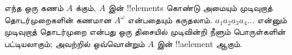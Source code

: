 \documentclass[../../../include/open-logic-section]{subfiles}
\begin{document}
\begin{ex}[முடிவுறாத் தொடர்முறைகள்]
எந்த ஒரு கணம் $A$ க்கும், $A$ இன் !!{element}s கொண்டு அமையும் முடிவுறாத்
தொடர்முறைகளின் கணமான $A^\omega$ என்பதையும் கருதலாம்.
$a_1a_2a_3a_4\dots$ என்னும் முடிவுறாத் தொடர்முறை என்பது
ஒரு திசையில் முடிவின்றி நீளும் பொருள்களின் பட்டியலாகும்;
அவற்றில் ஒவ்வொன்றும் $A$ இன் !!a{element} ஆகும்.
\end{ex}
\end{document}

